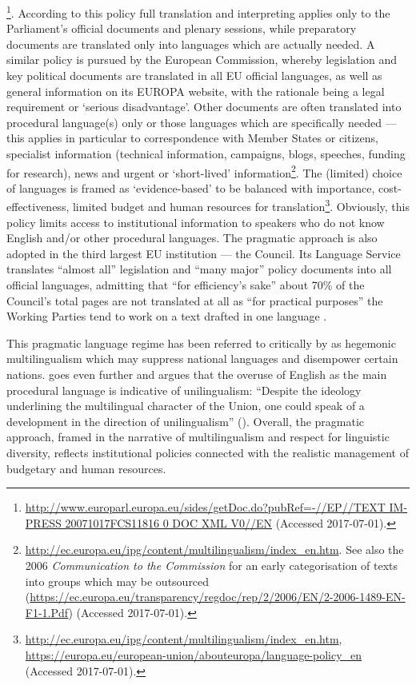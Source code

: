 \documentclass[output=paper]{langsci/langscibook}
\begin{document}
\footnote{\url{http://www.europarl.europa.eu/sides/getDoc.do?pubRef=-//EP//TEXT IM-PRESS 20071017FCS11816 0 DOC XML V0//EN} (Accessed 2017-07-01).}. According to this policy full translation and interpreting applies only to the Parliament’s official documents and plenary sessions, while preparatory documents are translated only into languages which are actually needed. A similar policy is pursued by the European Commission, whereby legislation and key political documents are translated in all EU official languages, as well as general information on its EUROPA website, with the rationale being a legal requirement or ‘serious disadvantage’. Other documents are often translated into procedural language(s) only or those languages which are specifically needed — this applies in particular to correspondence with Member States or citizens, specialist information (technical information, campaigns, blogs, speeches, funding for research), news and urgent or ‘short-lived’ information\footnote{\url{http://ec.europa.eu/ipg/content/multilingualism/index_en.htm}. See also the 2006 \textit{Communication to the Commission} for an early categorisation of texts into groups which may be outsourced (\url{https://ec.europa.eu/transparency/regdoc/rep/2/2006/EN/2-2006-1489-EN-F1-1.Pdf}) (Accessed 2017-07-01).}. The (limited) choice of languages is framed as ‘evidence-based’ to be balanced with importance, cost-effectiveness, limited budget and human resources for translation\footnote{\url{http://ec.europa.eu/ipg/content/multilingualism/index_en.htm}, \url{https://europa.eu/european-union/abouteuropa/language-policy_en} (Accessed 2017-07-01).}. Obviously, this policy limits access to institutional information to speakers who do not know English and/or other procedural languages. The pragmatic approach is also adopted in the third largest EU institution — the Council. Its Language Service translates “almost all” legislation and “many major” policy documents into all official languages, admitting that “for efficiency’s sake” about 70\% of the Council’s total pages are not translated at all as “for practical purposes” the Working Parties tend to work on a text drafted in one language \citep[8]{GSC2012}.

This pragmatic language regime has been referred to critically by \citet{Krzyżanowski2011} as hegemonic multilingualism which may suppress national languages and disempower certain nations. \citeauthor{Mattila2013} goes even further and argues that the overuse of English as the main procedural language is indicative of unilingualism: “Despite the ideology underlining the multilingual character of the Union, one could speak of a development in the direction of unilingualism” (\citeyear[33]{Mattila2013}). Overall, the pragmatic approach, framed in the narrative of multilingualism and respect for linguistic diversity, reflects institutional policies connected with the realistic management of budgetary and human resources. 
\end{document}
